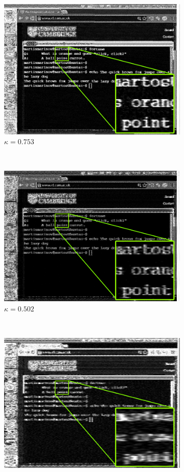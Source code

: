 \documentclass[a4paper,12pt,twoside,openright]{report}
\begin{document}
\begin{figure}[p!]
\begin{subfigure}[b]{0.45\textwidth}
  \includegraphics[width=\textwidth]{sr_30MHz_at_190MHz}
  \caption{$\kappa = 0.753$}
\end{subfigure} ~
\begin{subfigure}[b]{0.45\textwidth}
  \includegraphics[width=\textwidth]{sr_20MHz_at_190MHz}
  \caption{$\kappa = 0.502$}
\end{subfigure} ~
\begin{subfigure}[b]{0.45\textwidth}
  \includegraphics[width=\textwidth]{sr_10MHz_at_190MHz}

\end{subfigure}
\end{figure}
\end{document}
